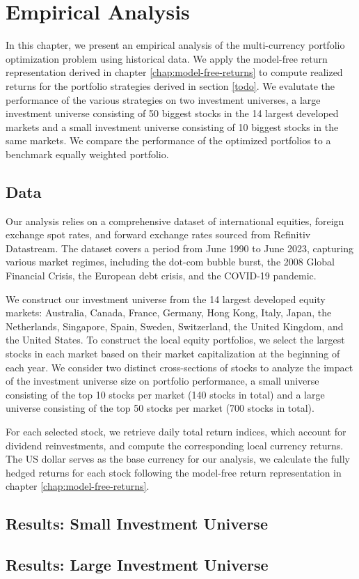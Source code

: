 \chapter{Empirical Analysis}

In this chapter, we present an empirical analysis of the multi-currency portfolio optimization problem using historical data. We apply the model-free return representation derived in chapter \ref{chap:model-free-returns} to compute realized returns for the portfolio strategies derived in section \ref{todo}. We evalutate the performance of the various strategies on two investment universes, a large investment universe consisting of 50 biggest stocks in the 14 largest developed markets and a small investment universe consisting of 10 biggest stocks in the same markets. We compare the performance of the optimized portfolios to a benchmark equally weighted portfolio. 

\section{Data}

Our analysis relies on a comprehensive dataset of international equities, foreign exchange spot rates, and forward exchange rates sourced from Refinitiv Datastream. The dataset covers a period from June 1990 to June 2023, capturing various market regimes, including the dot-com bubble burst, the 2008 Global Financial Crisis, the European debt crisis, and the COVID-19 pandemic. 

We construct our investment universe from the 14 largest developed equity markets: Australia, Canada, France, Germany, Hong Kong, Italy, Japan, the Netherlands, Singapore, Spain, Sweden, Switzerland, the United Kingdom, and the United States. To construct the local equity portfolios, we select the largest stocks in each market based on their market capitalization at the beginning of each year. We consider two distinct cross-sections of stocks to analyze the impact of the investment universe size on portfolio performance, a small universe consisting of the top 10 stocks per market (140 stocks in total) and a large universe consisting of the top 50 stocks per market (700 stocks in total). 

For each selected stock, we retrieve daily total return indices, which account for dividend reinvestments, and compute the corresponding local currency returns. The US dollar serves as the base currency for our analysis, we calculate the fully hedged returns for each stock following the model-free return representation in chapter \ref{chap:model-free-returns}.

\section{Results: Small Investment Universe}

\section{Results: Large Investment Universe}

